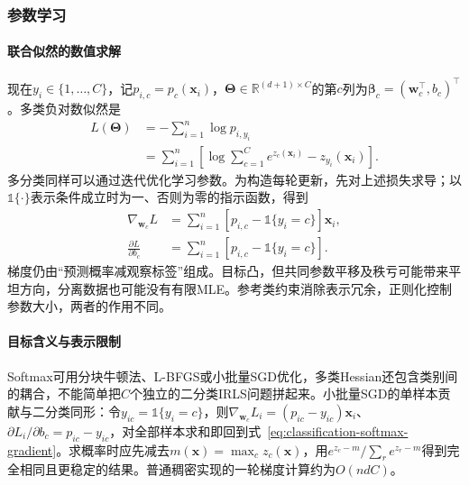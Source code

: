 \subsubsection{参数学习}
\label{sec:classification-softmax-learning}

\paragraph{联合似然的数值求解}
现在$y_i\in\{1,\ldots,C\}$，记$p_{i,c}=p_c(\bm{x}_i)$，$\bm{\Theta}\in\mathbb{R}^{(d+1)\times C}$的第$c$列为$\bm{\beta}_c=(\bm{w}_c^{\top},b_c)^{\top}$。多类负对数似然是
\begin{equation}
  \label{eq:classification-softmax-loss}
  \begin{aligned}
    L(\bm{\Theta})
      &=-\sum_{i=1}^{n}\log p_{i,y_i}\\
      &=\sum_{i=1}^{n}\left[
        \log\sum_{c=1}^{C}e^{z_c(\bm{x}_i)}
        -z_{y_i}(\bm{x}_i)\right].
  \end{aligned}
\end{equation}
多分类同样可以通过迭代优化学习参数。为构造每轮更新，先对上述损失求导；以$\mathbb{1}\{\cdot\}$表示条件成立时为一、否则为零的指示函数，得到
\begin{equation}
  \label{eq:classification-softmax-gradient}
  \begin{aligned}
    \nabla_{\bm{w}_c}L
      &=\sum_{i=1}^{n}
        [p_{i,c}-\mathbb{1}\{y_i=c\}]\bm{x}_i,\\
    \frac{\partial L}{\partial b_c}
      &=\sum_{i=1}^{n}
        [p_{i,c}-\mathbb{1}\{y_i=c\}].
  \end{aligned}
\end{equation}
梯度仍由“预测概率减观察标签”组成。目标凸，但共同参数平移及秩亏可能带来平坦方向，分离数据也可能没有有限MLE。参考类约束消除表示冗余，正则化控制参数大小，两者的作用不同。

\paragraph{目标含义与表示限制}
Softmax可用分块牛顿法、L-BFGS或小批量SGD优化，多类Hessian还包含类别间的耦合，不能简单把$C$个独立的二分类IRLS问题拼起来。小批量SGD的单样本贡献与二分类同形：令$y_{ic}=\mathbb{1}\{y_i=c\}$，则$\nabla_{\bm{w}_c}L_i=(p_{ic}-y_{ic})\bm{x}_i$、$\partial L_i/\partial b_c=p_{ic}-y_{ic}$，对全部样本求和即回到式~\eqref{eq:classification-softmax-gradient}。求概率时应先减去$m(\bm{x})=\max_c z_c(\bm{x})$，用$e^{z_c-m}/\sum_r e^{z_r-m}$得到完全相同且更稳定的结果。普通稠密实现的一轮梯度计算约为$O(ndC)$。

